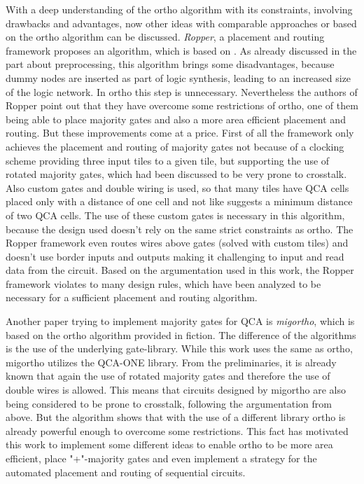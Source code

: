 With a deep understanding of the ortho algorithm with its constraints, involving drawbacks and advantages, now other ideas with comparable approaches or based on the ortho algorithm can be discussed. \textit{Ropper}, a placement and routing framework \cite{ropper} proposes an algorithm, which is based on \cite{trindade2016placement}. As already discussed in the part about preprocessing, this algorithm brings some disadvantages, because dummy nodes are inserted as part of logic synthesis, leading to an increased size of the logic network. In ortho this step is unnecessary. Nevertheless the authors of Ropper point out that they have overcome some restrictions of ortho, one of them being able to place majority gates and also a more area efficient placement and routing. But these improvements come at a price. First of all the framework only achieves the placement and routing of majority gates not because of a clocking scheme providing three input tiles to a given tile, but supporting the use of rotated majority gates, which had been discussed to be very prone to crosstalk. Also custom gates and double wiring is used, so that many tiles have QCA cells placed only with a distance of one cell and not like \cite{crosstalk} suggests a minimum distance of two QCA cells. The use of these custom gates is necessary in this algorithm, because the design used doesn't rely on the same strict constraints as ortho. The Ropper framework even routes wires above gates (solved with custom tiles) and doesn't use border inputs and outputs making it challenging to input and read data from the circuit. Based on the argumentation used in this work, the Ropper framework violates to many design rules, which have been analyzed to be necessary for a sufficient placement and routing algorithm.

Another paper trying to implement majority gates for QCA is \textit{migortho}, which is based on the ortho algorithm provided in fiction. The difference of the algorithms is the use of the underlying gate-library. While this work uses the same as ortho, migortho utilizes the QCA-ONE library. From the preliminaries, it is already known that again the use of rotated majority gates and therefore the use of double wires is allowed. This means that circuits designed by migortho are also being considered to be prone to crosstalk, following the argumentation from above. But the algorithm shows that with the use of a different library ortho is already powerful enough to overcome some restrictions. This fact has motivated this work to implement some different ideas to enable ortho to be more area efficient, place "+"-majority gates and even implement a strategy for the automated placement and routing of sequential circuits.


